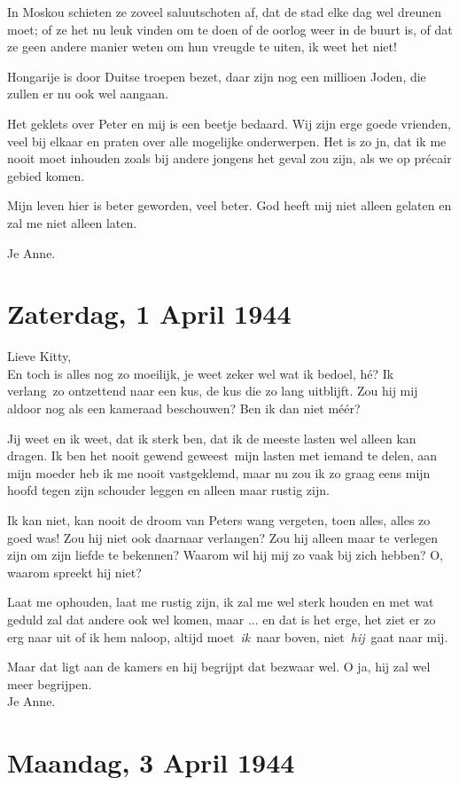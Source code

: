 \documentclass{book}
\begin{document}
In Moskou schieten ze zoveel saluutschoten af, dat de stad elke dag wel
dreunen moet; of ze het nu leuk vinden om te doen of de oorlog weer in
de buurt is, of dat ze geen andere manier weten om hun vreugde te uiten,
ik weet het niet!

Hongarije is door Duitse troepen bezet, daar zijn nog een millioen
Joden, die zullen er nu ook wel aangaan.

Het geklets over Peter en mij is een beetje bedaard. Wij zijn erge goede
vrienden, veel bij elkaar en praten over alle mogelijke onderwerpen. Het
is zo jn, dat ik me nooit moet inhouden zoals bij andere jongens het
geval zou zijn, als we op précair gebied komen.

Mijn leven hier is beter geworden, veel beter. God heeft mij niet alleen
gelaten en zal me niet alleen laten.

Je Anne.

\chapter{Zaterdag, 1 April 1944}

Lieve Kitty,\\En toch is alles nog zo moeilijk, je weet zeker wel wat ik
bedoel, hé? Ik verlang~zo ontzettend naar een kus, de kus die zo lang
uitblijft. Zou hij mij aldoor nog als een kameraad beschouwen? Ben ik
dan niet méér?

Jij weet en ik weet, dat ik sterk ben, dat ik de meeste lasten wel
alleen kan dragen. Ik ben het nooit gewend geweest~mijn lasten met
iemand te delen, aan mijn moeder heb ik me nooit vastgeklemd, maar nu
zou ik zo graag eens mijn hoofd tegen zijn schouder leggen en alleen
maar rustig zijn.

Ik kan niet, kan nooit de droom van Peters wang vergeten, toen alles,
alles zo goed was! Zou hij niet ook daarnaar verlangen? Zou hij alleen
maar te verlegen zijn om zijn liefde te bekennen? Waarom wil hij mij zo
vaak bij zich hebben? O, waarom spreekt hij niet?

Laat me ophouden, laat me rustig zijn, ik zal me wel sterk houden en met
wat geduld zal dat andere ook wel komen, maar ... en dat is het erge,
het ziet er zo erg naar uit of ik hem naloop, altijd moet~\emph{ik}~naar
boven, niet~\emph{hij}~gaat naar mij.

Maar dat ligt aan de kamers en hij begrijpt dat bezwaar wel. O ja, hij
zal wel meer begrijpen.\\Je Anne.

\chapter{Maandag, 3 April 1944}
\end{document}
